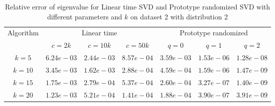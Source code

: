 \begin{table}\label{sigma22}
\centering
\begin{tabular}{|c|c|c|c|c|c|c|}

\hline
\multirow{2}{*}{ Algorithm} &\multicolumn{3}{c|}{Linear time} &\multicolumn{3}{c|}{Prototype randomized}\\\cline{2-7}
 &$c=2k$ &$c=10k$ &$c=50k$ &$q=0$ &$q=1$ &$q=2$\\\hline
$k=5$ & $6.24e-03$ & $2.44e-03$ & $8.57e-04$ & $3.59e-03$ & $1.53e-06$ & $1.28e-08$\\\hline
$k=10$ & $3.45e-03$ & $1.62e-03$ & $2.88e-04$ & $4.59e-04$ & $1.59e-06$ & $1.47e-09$\\\hline
$k=15$ & $1.75e-03$ & $2.79e-04$ & $5.37e-04$ & $2.60e-04$ & $3.27e-07$ & $1.40e-09$\\\hline
$k=20$ & $1.23e-03$ & $5.21e-04$ & $1.41e-04$ & $1.88e-04$ & $3.90e-07$ & $3.91e-09$\\\hline
\end{tabular}
\caption{Relative error of eigenvalue for Linear time SVD and Prototype randomized SVD with different parameters and $k$ on dataset 2 with distribution 2}
\end{table}
